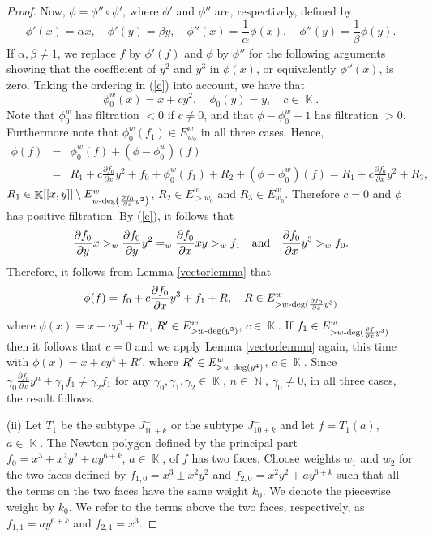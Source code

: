 \documentclass[noend]{amsproc}
\theoremstyle{definition}
\DeclareMathOperator{\N}{\mathbb{N}}
\DeclareMathOperator{\K}{\mathbb{K}}
\DeclareMathOperator{\dash}{\!\textnormal{-}\!}
\begin{document}
\begin{proof}
Now, $\phi=\phi''\circ\phi'$, where $\phi'$ and $\phi''$ are, respectively,
defined by
\[
\phi'(x)=\alpha x,\quad \phi'(y)=\beta y, \quad
\phi''(x)=\frac{1}{\alpha}\phi(x), \quad\phi''(y)=\frac{1}{\beta}\phi(y).
\]
If $\alpha,\beta\neq 1$, we replace $f$ by $\phi'(f)$ and $\phi$ by $\phi''$
for the following arguments showing that the coefficient of $y^2$ and $y^3$ in
$\phi(x)$, or equivalently $\phi''(x)$, is zero. Taking the ordering in
(\ref{c}) into account, we have that
\[
\phi_0^w(x)=x+cy^2, \quad\phi_0(y)=y,\quad c\in\K.
\]
Note that $\phi^w_0$ has filtration $<0$ if $c\neq 0$, and that
$\phi-\phi^w_0+1$ has filtration $>0$. Furthermore note that
$\phi_0^w(f_1)\in E_{w_0}^w$ in all three cases. Hence,
\begin{eqnarray*}
\phi(f)&=&\phi_0^w(f)+(\phi-\phi^w_0)(f)\\
&=& R_1+c\frac{\partial f_0}{\partial x}y^2+f_0+\phi^w_0(f_1)+R_2
+(\phi-\phi^w_0)(f)=R_1+c\frac{\partial f_0}{\partial x}y^2+R_3,
\end{eqnarray*}
$R_1\in\K[[x,y]]
\setminus E^w_{w\dash\deg\left(\frac{\partial f_0}{\partial x}y^2\right)}$,
$R_2\in E^w_{>w_0}$ and $R_3\in E^w_{w_0}$. Therefore $c=0$ and $\phi$ has
positive filtration.
By (\ref{c}), it follows that
\begin{equation*}
\frac{\partial f_0}{\partial y}x >_w\frac{\partial f_0}{\partial y}y^2
=_w \frac{\partial f_0}{\partial x}xy>_w f_1\quad
\textnormal{and}\quad \frac{\partial f_0}{\partial x}y^3>_w f_0.
\end{equation*}
Therefore, it follows from Lemma \ref{vectorlemma} that
\begin{equation*}
\phi(f) = f_0+c\frac{\partial f_0}{\partial x}y^3+f_1+R,\quad
R\in E^w_{>w\dash\deg(\frac{\partial f_0}{\partial x}y^3)}
\end{equation*}
where $\phi(x) = x+ cy^3+R'$, $R'\in E^w_{>w\dash\deg(y^3)}$, $c\in\K$. If
$f_1\in E^w_{>w\dash\deg(\frac{\partial f}{\partial x}y^3)}$ then it follows
that $c=0$ and we apply Lemma \ref{vectorlemma} again, this time with
$\phi(x)=x+cy^4+R'$, where $R'\in E^w_{>w\dash\deg(y^4)}$, $c\in\K$. Since
$\gamma_0\frac{\partial f_0}{\partial x}y^n+\gamma_1f_1\neq \gamma_2f_1$ for
any $\gamma_0,\gamma_1,\gamma_2\in\K$, $n\in\N$, $\gamma_0\neq 0$, in all three
cases, the result follows.

(ii) Let $T_1$ be the subtype $J_{10+k}^+$ or the subtype $J_{10+k}^-$ and let
$f=T_1(a)$, $a\in\K$.
The Newton polygon defined by the principal part $f_0=x^3\pm x^2y^2+ay^{6+k}$,
$a\in\K$, of $f$ has two faces. Choose weights $w_1$ and $w_2$ for the two
faces defined by $f_{1,0}=x^3\pm x^2y^2$ and $f_{2,0}=x^2y^2+ay^{6+k}$ such
that all the terms on the two faces have the same weight $k_0$. We denote the
piecewise weight by $k_0$. We refer to the terms above the two faces,
respectively, as $f_{1,1}=ay^{6+k}$ and $f_{2,1}=x^3$.


\end{proof}
\end{document}
